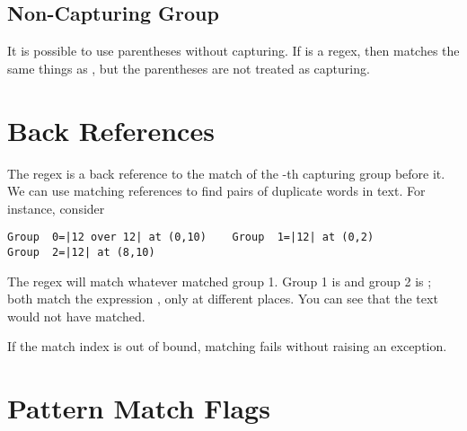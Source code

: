 \subsection{Non-Capturing Group}

It is possible to use parentheses without capturing.  If 
is a regex, then  matches the same things as
, but the parentheses are not treated as capturing.


\section{Back References}\label{section:regex-back-references}

The regex  is a back reference to the match of
the -th capturing group before it.  We can use matching
references to find pairs of duplicate words in text.  For instance,
consider
%
\begin{verbatim}
Group  0=|12 over 12| at (0,10)    Group  1=|12| at (0,2)
Group  2=|12| at (8,10)
\end{verbatim}
%
The regex  will match whatever matched group 1.  
Group 1 is  and group 2 is ; both
match the expression , only at different places.
You can see that the text  would not
have matched.  

If the match index is out of bound, matching fails without raising an
exception.


\section{Pattern Match Flags}\label{section:pattern-modes}


